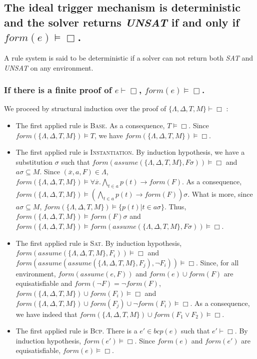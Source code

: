\documentclass[a4paper,10pt]{report}
\newcommand{\F}{\mathit{form}}
\newcommand{\A}{\mathit{assume}}
\newcommand{\B}{\mathit{bcp}}
\begin{document}
\subsection{The ideal trigger mechanism is deterministic
 and the solver returns \emph{UNSAT} if and only if $\F(e)\vDash\Box$.}
\noindent
A rule system is said to be deterministic if a solver can not return both \emph{SAT} and
\emph{UNSAT} on any environment.
\subsubsection*{If there is a finite proof of $e\vdash\Box$, $\F(e)\vDash\Box$.}
We proceed by structural induction over the proof of $\{\Lambda,\Delta,T,M\}\vdash\Box$ :
\begin{itemize}
 \item The first applied rule is \textsc{Base}. As a consequence, $T\vDash\Box$. Since
$\F(\{\Lambda,\Delta,T,M\})\vDash T$, we have $\F(\{\Lambda,\Delta,T,M\})\vDash\Box$.
 \item The first applied rule is \textsc{Instantiation}. By induction hypothesis,
we have a substitution $\sigma$ such that $\F(\A(\{\Lambda,\Delta,T,M\},F\sigma))\vDash\Box$
and $a\sigma\subseteq M$. Since $(\overline x,a,F)\in\Lambda$,
$\F(\{\Lambda,\Delta,T,M\})\vDash\forall \overline x.\bigwedge_{t\in a} p(t)\rightarrow\F(F)$.
As a consequence, $\F(\{\Lambda,\Delta,T,M\})\vDash(\bigwedge_{t\in a} p(t)\rightarrow\F(F))\sigma$.
What is more, since $a\sigma\subseteq M$, $\F(\{\Lambda,\Delta,T,M\})\vDash\{p(t)|t\in a\sigma\}$.
Thus, $\F(\{\Lambda,\Delta,T,M\})\vDash\F(F)\sigma$ and
$\F(\{\Lambda,\Delta,T,M\})\vDash\F(\A(\{\Lambda,\Delta,T,M\},F\sigma))\vDash\Box$.
 \item The first applied rule is \textsc{Sat}. By induction hypothesis,
$\F(\A(\{\Lambda,\Delta,T,M\},F_i))\vDash\Box$ and
$\F(\A(\A(\{\Lambda,\Delta,T,M\},F_j),\neg F_i))\vDash\Box$.
Since, for all environment, $\F(\A(e,F))$ and $\F(e)\cup\F(F)$ are equisatisfiable
and $\F(\neg F)=\neg\F(F)$, $\F(\{\Lambda,\Delta,T,M\})\cup\F(F_i)\vDash\Box$ and
$\F(\{\Lambda,\Delta,T,M\})\cup\F(F_j)\cup\neg\F(F_i)\vDash\Box$. As a consequence,
we have indeed that $\F(\{\Lambda,\Delta,T,M\})\cup\F(F_1\vee F_2)\vDash\Box$.
 \item The first applied rule is \textsc{Bcp}. There is a $e'\in\B(e)$ such that
$e'\vdash\Box$. By induction hypothesis, $\F(e')\vDash\Box$. Since $\F(e)$ and $\F(e')$
are equisatisfiable, $\F(e)\vDash\Box$.
\end{itemize}
\end{document}
